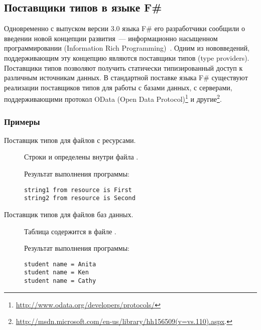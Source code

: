\subsection{Поставщики типов в языке F\#}\label{f-sharp-type-providers}
Одновременно с выпуском версии 3.0 языка F\# его разработчики сообщили о введении новой концепции развития~--- информационно насыщенном программировании (Information Rich Programming)~\cite{joepamer2011}.
Одним из нововведений, поддерживающим эту концепцию являются поставщики типов (type providers).
Поставщики типов позволяют получить статически типизированный доступ к различным источникам данных.
В стандартной поставке языка F\# существуют реализации поставщиков типов для работы с базами данных, с серверами, поддерживающими протокол OData (Open Data Protocol)\footnote{\url{http://www.odata.org/developers/protocols/}} и другие\footnote{\url{http://msdn.microsoft.com/en-us/library/hh156509(v=vs.110).aspx}.}.

\subsubsection{Примеры}
\begin{description}
\item[Поставщик типов для файлов с ресурсами.] Строки  и  определены внутри файла .
\begin{code}

Результат выполнения программы:
\begin{lstlisting}
string1 from resource is First
string2 from resource is Second
\end{lstlisting}\end{code}

\clearpage

\item[Поставщик типов для файлов баз данных.] Таблица  содержится в файле .
\begin{code}


Результат выполнения программы:
\begin{lstlisting}
student name = Anita
student name = Ken
student name = Cathy
\end{lstlisting}\end{code}

\end{description}